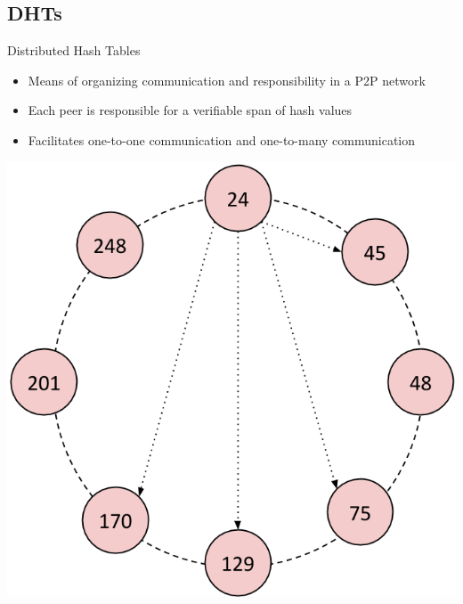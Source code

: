 \documentclass[11pt]{beamer}
\begin{document}
\subsection{DHTs}
\begin{frame}{Distributed Hash Tables}

	\begin{itemize}
		\item  Means of organizing communication and responsibility in a P2P network
		\item  Each peer is responsible for a verifiable span of hash values
		\item  Facilitates one-to-one communication and one-to-many communication
	\end{itemize}

	\begin{center}
\includegraphics[width=0.4\linewidth]{figs/CR_overlay}
\end{center}


\end{frame}
%
%	
\end{document}
